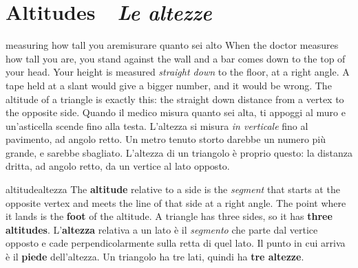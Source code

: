 \documentclass[10pt,a4paper,oneside]{book}
\newcommand{\bisection}[2]{%
  \Needspace{7\baselineskip}%
  \section[#1 \textperiodcentered\ #2]{#1 {\color{itgreen}\itshape\,\textperiodcentered\ #2}}}
\begin{document}
\bisection{Altitudes}{Le altezze}\label{sec:altitudes}
\begin{anchor}{measuring how tall you are}{misurare quanto sei alto}
When the doctor measures how tall you are, you stand against the wall and a bar comes down to the top of your head. Your height is measured \emph{straight down} to the floor, at a right angle. A tape held at a slant would give a bigger number, and it would be wrong. The altitude of a triangle is exactly this: the straight down distance from a vertex to the opposite side.
\tcblower
Quando il medico misura quanto sei alta, ti appoggi al muro e un'asticella scende fino alla testa. L'altezza si misura \emph{in verticale} fino al pavimento, ad angolo retto. Un metro tenuto storto darebbe un numero più grande, e sarebbe sbagliato. L'altezza di un triangolo è proprio questo: la distanza dritta, ad angolo retto, da un vertice al lato opposto.
\end{anchor}

\begin{defn}{altitude}{altezza}
The \textbf{altitude} relative to a side is the \emph{segment} that starts at the opposite vertex and meets the line of that side at a right angle. The point where it lands is the \textbf{foot} of the altitude. A triangle has three sides, so it has \textbf{three altitudes}.
\tcblower
L'\textbf{altezza} relativa a un lato è il \emph{segmento} che parte dal vertice opposto e cade perpendicolarmente sulla retta di quel lato. Il punto in cui arriva è il \textbf{piede} dell'altezza. Un triangolo ha tre lati, quindi ha \textbf{tre altezze}.
\end{defn}
\end{document}
